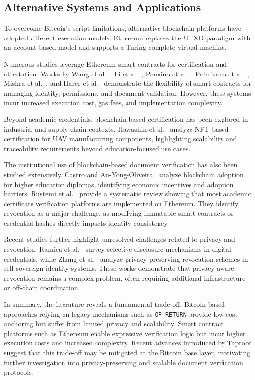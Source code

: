 \subsection{Alternative Systems and Applications}

To overcome Bitcoin’s script limitations, alternative blockchain platforms have adopted different execution models.
Ethereum replaces the UTXO paradigm with an account-based model and supports a Turing-complete virtual machine.

Numerous studies leverage Ethereum smart contracts for certification and attestation.
Works by Wang et al.~\cite{Wang2019BlockchainCT}, Li et al.~\cite{Li2020DecentralizedPKI}, Pennino et al.~\cite{Pennino2021EfficientCertification}, Palmisano et al.~\cite{Palmisano2022NotarizationAntiPlagiarism}, Mishra et al.~\cite{Mishra2025BlockchainDecentralized}, and Harer et al.~\cite{Harer2022DecentralizedAttestation} demonstrate the flexibility of smart contracts for managing identity, permissions, and document validation.
However, these systems incur increased execution cost, gas fees, and implementation complexity.

Beyond academic credentials, blockchain-based certification has been explored in industrial and supply-chain contexts.
Hawashin et al.~\cite{Hawashin2024UAVTraceability} analyze NFT-based certification for UAV manufacturing components, highlighting scalability and traceability requirements beyond education-focused use cases.

The institutional use of blockchain-based document verification has also been studied extensively.
Castro and Au-Yong-Oliveira~\cite{Castro2021BlockchainHigherEducation} analyze blockchain adoption for higher education diplomas, identifying economic incentives and adoption barriers.
Rustemi et al.~\cite{Rustemi2023SLRBlockchainCertificates} provide a systematic review showing that most academic certificate verification platforms are implemented on Ethereum.
They identify revocation as a major challenge, as modifying immutable smart contracts or credential hashes directly impacts identity consistency.

Recent studies further highlight unresolved challenges related to privacy and revocation.
Ramica et al.~\cite{Ramica2024SelectiveDisclosure} survey selective disclosure mechanisms in digital credentials, while Zhang et al.~\cite{Zhang2025PrivacyProtectionIssuanceRevocationVerifiableCredentials} analyze privacy-preserving revocation schemes in self-sovereign identity systems.
These works demonstrate that privacy-aware revocation remains a complex problem, often requiring additional infrastructure or off-chain coordination.

In summary, the literature reveals a fundamental trade-off.
Bitcoin-based approaches relying on legacy mechanisms such as \texttt{OP\_RETURN} provide low-cost anchoring but suffer from limited privacy and scalability.
Smart contract platforms such as Ethereum enable expressive verification logic but incur higher execution costs and increased complexity.
Recent advances introduced by Taproot suggest that this trade-off may be mitigated at the Bitcoin base layer, motivating further investigation into privacy-preserving and scalable document verification protocols.

